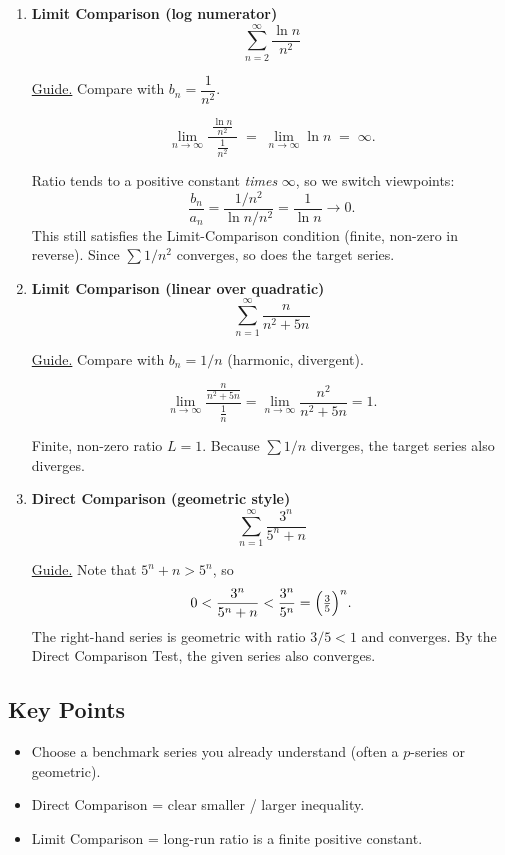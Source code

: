\documentclass{article}
\begin{document}
\begin{enumerate}[label=\textbf{\arabic*.},itemsep=14pt]

\item \textbf{Limit Comparison (log numerator)}  
      \[
      \sum_{n=2}^{\infty}\frac{\ln n}{n^{2}}
      \]

      \underline{Guide.}  Compare with \(b_n=\dfrac{1}{n^{2}}\).

      \[
      \lim_{n\to\infty}\frac{\;\tfrac{\ln n}{n^{2}}\;}{\;\tfrac{1}{n^{2}}\;}
      \;=\;
      \lim_{n\to\infty} \ln n
      \;=\;\infty.
      \]

      Ratio tends to a positive constant \emph{times} \(\infty\), so we switch viewpoints:
      \[
      \frac{b_n}{a_n} = \frac{1/n^{2}}{\ln n/n^{2}} = \frac{1}{\ln n}
      \longrightarrow 0.
      \]
      This still satisfies the Limit-Comparison condition (finite, non-zero in reverse).
      Since \(\sum 1/n^{2}\) converges, so does the target series.

\item \textbf{Limit Comparison (linear over quadratic)}  
      \[
      \sum_{n=1}^{\infty} \frac{n}{n^{2}+5n}
      \]

      \underline{Guide.}  Compare with \(b_n=1/n\) (harmonic, divergent).

      \[
      \lim_{n\to\infty}\frac{\tfrac{n}{n^{2}+5n}}{\tfrac{1}{n}}
      =\lim_{n\to\infty}\frac{n^{2}}{n^{2}+5n}=1.
      \]

      Finite, non-zero ratio \(L=1\).  
      Because \(\sum 1/n\) diverges, the target series also diverges.

\item \textbf{Direct Comparison (geometric style)}  
      \[
      \sum_{n=1}^{\infty}\frac{3^{n}}{5^{n}+n}
      \]

      \underline{Guide.}  Note that \(5^{n}+n > 5^{n}\), so
      \[
      0 < \frac{3^{n}}{5^{n}+n} < \frac{3^{n}}{5^{n}}
      = \Bigl(\tfrac{3}{5}\Bigr)^{n}.
      \]
      The right-hand series is geometric with ratio \(3/5<1\) and converges.
      By the Direct Comparison Test, the given series also converges.

\end{enumerate}



\subsection*{Key Points}
\begin{itemize}[itemsep=4pt]
  \item Choose a benchmark series you already understand (often a \(p\)-series or geometric).
  \item Direct Comparison = clear smaller / larger inequality.  
  \item Limit Comparison = long-run ratio is a finite positive constant.
\end{itemize}
\end{document}
